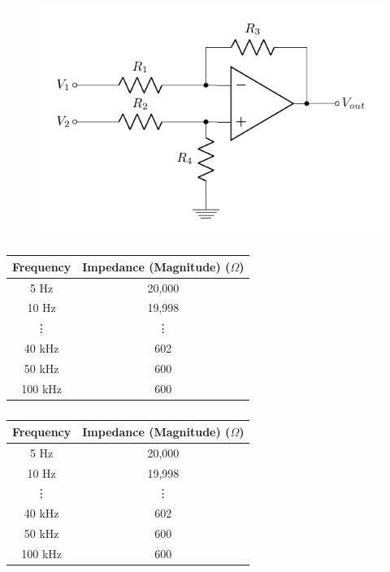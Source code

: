 \documentclass[12pt]{article}
\begin{document}
	\begin{figure}[H] %
		\centering
		\includegraphics{diffamp}
		\caption{\rajah}
		\label{fig:diffamp3}
	\end{figure}

	\begin{table}[H]
		\centering
		\caption{\jadual}	%
		\begin{tabular}{cc}
			\toprule
			\multicolumn{1}{l}{\textbf{Frequency}} & \multicolumn{1}{l}{\textbf{Impedance (Magnitude) ($\Omega$)}} \\
			\midrule
			5 Hz  & 20,000 \\
			10 Hz & 19,998 \\
			\vdots     & \vdots \\
			40 kHz & 602 \\
			50 kHz & 600 \\
			100 kHz & 600 \\
			\bottomrule
		\end{tabular}
		\label{table:freqmag}%
	\end{table}%

	\begin{table}[H]
		\centering
		\caption{\jadual}	%
		\begin{tabular}{cc}
			\toprule
			\multicolumn{1}{l}{\textbf{Frequency}} & \multicolumn{1}{l}{\textbf{Impedance (Magnitude) ($\Omega$)}} \\
			\midrule
			5 Hz  & 20,000 \\
			10 Hz & 19,998 \\
			\vdots     & \vdots \\
			40 kHz & 602 \\
			50 kHz & 600 \\
			100 kHz & 600 \\
			\bottomrule
		\end{tabular}
		\label{table:freqmag2}%
	\end{table}%
	
\end{document}
